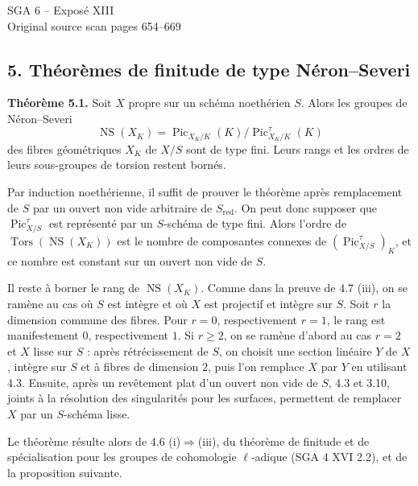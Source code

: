 \documentclass[11pt]{article}
\providecommand{\Pic}{\operatorname{Pic}}
\begin{document}
\providecommand{\NS}{\operatorname{NS}}
\providecommand{\Picard}{\operatorname{Pic}}
\providecommand{\Et}{\mathrm{et}}
\providecommand{\rk}{\operatorname{rk}}
\providecommand{\im}{\operatorname{Im}}
\providecommand{\HH}{\mathrm H}

\begin{center}
{\Large SGA 6 -- Exposé XIII}\\[0.4em]
{\large Original source scan pages 654--669}
\end{center}


\subsection*{5. Th\'eor\`emes de finitude de type N\'eron--Severi}

\textbf{Th\'eor\`eme 5.1.} Soit $X$ propre sur un sch\'ema noeth\'erien $S$. Alors les groupes de N\'eron--Severi
\[
   \NS(X_K)=\Pic_{X_K/K}(K)/\Pic^\tau_{X_K/K}(K)
\]
des fibres g\'eom\'etriques $X_K$ de $X/S$ sont de type fini. Leurs rangs et les ordres de leurs sous-groupes de torsion restent born\'es.

Par induction noeth\'erienne, il suffit de prouver le th\'eor\`eme apr\`es remplacement de $S$ par un ouvert non vide arbitraire de $S_{\mathrm{red}}$. On peut donc supposer que $\Pic^\tau_{X/S}$ est repr\'esent\'e par un $S$-sch\'ema de type fini. Alors l'ordre de $\operatorname{Tors}(\NS(X_K))$ est le nombre de composantes connexes de $(\Pic^\tau_{X/S})_K$, et ce nombre est constant sur un ouvert non vide de $S$.

Il reste \`a borner le rang de $\NS(X_K)$. Comme dans la preuve de 4.7 (iii), on se ram\`ene au cas o\`u $S$ est int\`egre et o\`u $X$ est projectif et int\`egre sur $S$. Soit $r$ la dimension commune des fibres. Pour $r=0$, respectivement $r=1$, le rang est manifestement $0$, respectivement $1$. Si $r\ge2$, on se ram\`ene d'abord au cas $r=2$ et $X$ lisse sur $S$ : apr\`es r\'etr\'ecissement de $S$, on choisit une section lin\'eaire $Y$ de $X$, int\`egre sur $S$ et \`a fibres de dimension $2$, puis l'on remplace $X$ par $Y$ en utilisant 4.3. Ensuite, apr\`es un rev\^etement plat d'un ouvert non vide de $S$, 4.3 et 3.10, joints \`a la r\'esolution des singularit\'es pour les surfaces, permettent de remplacer $X$ par un $S$-sch\'ema lisse.

Le th\'eor\`eme r\'esulte alors de 4.6 (i)$\Rightarrow$(iii), du th\'eor\`eme de finitude et de sp\'ecialisation pour les groupes de cohomologie $\ell$-adique (SGA 4 XVI 2.2), et de la proposition suivante.
\end{document}
